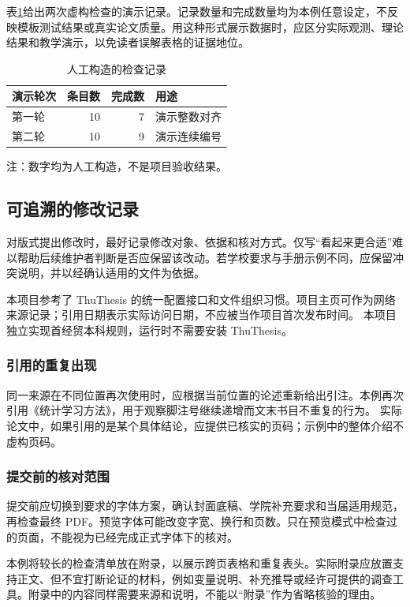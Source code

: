 表\ref{tab:review}给出两次虚构检查的演示记录。记录数量和完成数量均为本例任意设定，不反映模板测试结果或真实论文质量。用这种形式展示数据时，应区分实际观测、理论结果和教学演示，以免读者误解表格的证据地位。
\begin{table}[htbp]
  \centering
  \caption{人工构造的检查记录}
  \label{tab:review}
  \begin{tabular}{lrrl}
    \toprule
    演示轮次 & 条目数 & 完成数 & 用途 \\
    \midrule
    第一轮 & 10 & 7 & 演示整数对齐 \\
    第二轮 & 10 & 9 & 演示连续编号 \\
    \bottomrule
  \end{tabular}
  \par\smallskip
  {注：数字均为人工构造，不是项目验收结果。}
\end{table}

\subsection{可追溯的修改记录}
对版式提出修改时，最好记录修改对象、依据和核对方式。仅写“看起来更合适”难以帮助后续维护者判断是否应保留该改动。若学校要求与手册示例不同，应保留冲突说明，并以经确认适用的文件为依据。

本项目参考了 ThuThesis 的统一配置接口和文件组织习惯。项目主页可作为网络来源记录；引用日期表示实际访问日期，不应被当作项目首次发布时间。 本项目独立实现首经贸本科规则，运行时不需要安装 ThuThesis。

\subsubsection{引用的重复出现}
同一来源在不同位置再次使用时，应根据当前位置的论述重新给出引注。本例再次引用《统计学习方法》，用于观察脚注号继续递增而文末书目不重复的行为。 实际论文中，如果引用的是某个具体结论，应提供已核实的页码；示例中的整体介绍不虚构页码。

\subsubsection{提交前的核对范围}
提交前应切换到要求的字体方案，确认封面底稿、学院补充要求和当届适用规范，再检查最终 PDF。预览字体可能改变字宽、换行和页数。只在预览模式中检查过的页面，不能视为已经完成正式字体下的核对。

本例将较长的检查清单放在附录，以展示跨页表格和重复表头。实际附录应放置支持正文、但不宜打断论证的材料，例如变量说明、补充推导或经许可提供的调查工具。附录中的内容同样需要来源和说明，不能以“附录”作为省略核验的理由。
